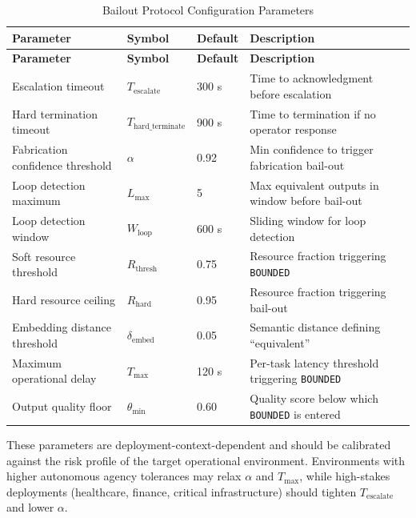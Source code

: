 \begin{longtable}{|l|l|l|l|}
\caption{Bailout Protocol Configuration Parameters} \\
\hline
\textbf{Parameter} & \textbf{Symbol} & \textbf{Default} & \textbf{Description} \\
\hline
\endfirsthead
\hline
\textbf{Parameter} & \textbf{Symbol} & \textbf{Default} & \textbf{Description} \\
\hline
\endhead
Escalation timeout & $T_{\text{escalate}}$ & 300 s & Time to acknowledgment before escalation \\
Hard termination timeout & $T_{\text{hard\_terminate}}$ & 900 s & Time to termination if no operator response \\
Fabrication confidence threshold & $\alpha$ & 0.92 & Min confidence to trigger fabrication bail-out \\
Loop detection maximum & $L_{\max}$ & 5 & Max equivalent outputs in window before bail-out \\
Loop detection window & $W_{\text{loop}}$ & 600 s & Sliding window for loop detection \\
Soft resource threshold & $R_{\text{thresh}}$ & 0.75 & Resource fraction triggering \texttt{BOUNDED} \\
Hard resource ceiling & $R_{\text{hard}}$ & 0.95 & Resource fraction triggering bail-out \\
Embedding distance threshold & $\delta_{\text{embed}}$ & 0.05 & Semantic distance defining ``equivalent'' \\
Maximum operational delay & $T_{\max}$ & 120 s & Per-task latency threshold triggering \texttt{BOUNDED} \\
Output quality floor & $\theta_{\min}$ & 0.60 & Quality score below which \texttt{BOUNDED} is entered \\
\hline
\end{longtable}

These parameters are deployment-context-dependent and should be calibrated against the risk profile of the target operational environment. Environments with higher autonomous agency tolerances may relax $\alpha$ and $T_{\max}$, while high-stakes deployments (healthcare, finance, critical infrastructure) should tighten $T_{\text{escalate}}$ and lower $\alpha$.
